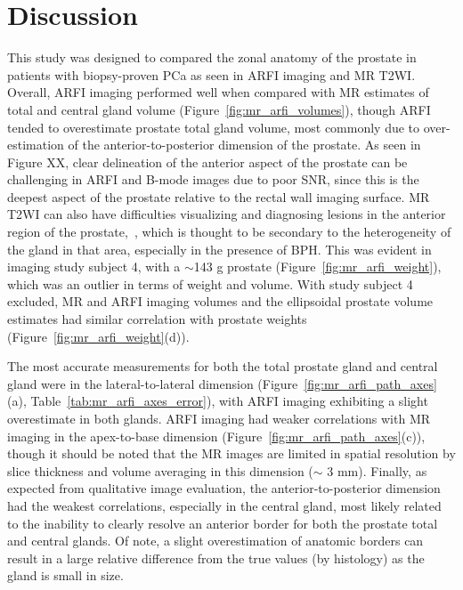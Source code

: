 \section{Discussion}\label{sect:discussion}

This study was designed to compared the zonal anatomy of the prostate in
patients with biopsy-proven PCa as seen in ARFI imaging and MR T2WI.  Overall,
ARFI imaging performed well when compared with MR estimates of total and
central gland volume (Figure~\ref{fig:mr_arfi_volumes}), though ARFI tended to
overestimate prostate total gland volume, most commonly due to over-estimation
of the anterior-to-posterior dimension of the prostate.  As seen in Figure XX,
clear delineation of the anterior aspect of the prostate can be challenging in
ARFI and B-mode images due to poor SNR, since this is the deepest aspect of the
prostate relative to the rectal wall imaging surface. MR T2WI can also have
difficulties visualizing and diagnosing lesions in the anterior region of the
prostate,~\cite{Gupta2013}, which is thought to be secondary to the
heterogeneity of the gland in that area, especially in the presence of BPH.
This was evident in imaging study subject 4, with a $\sim$143 g prostate
(Figure~\ref{fig:mr_arfi_weight}), which was an outlier in terms of weight and
volume.  With study subject 4 excluded, MR and ARFI imaging volumes and the
ellipsoidal prostate volume estimates had similar correlation with prostate
weights (Figure~\ref{fig:mr_arfi_weight}(d)).

The most accurate measurements for both the total prostate gland and central
gland were in the lateral-to-lateral dimension
(Figure~\ref{fig:mr_arfi_path_axes}(a), Table~\ref{tab:mr_arfi_axes_error}),
with ARFI imaging exhibiting a slight overestimate in both glands.  ARFI
imaging had weaker correlations with MR imaging in the apex-to-base dimension
(Figure~\ref{fig:mr_arfi_path_axes}(c)), though it should be noted that the MR
images are limited in spatial resolution by slice thickness and volume
averaging in this dimension ($\sim$ 3 mm).  Finally, as expected from
qualitative image evaluation, the anterior-to-posterior dimension had the
weakest correlations, especially in the central gland, most likely related to
the inability to clearly resolve an anterior border for both the prostate total
and central glands. Of note, a slight overestimation of anatomic borders can
result in a large relative difference from the true values (by histology) as the gland
is small in size. 


